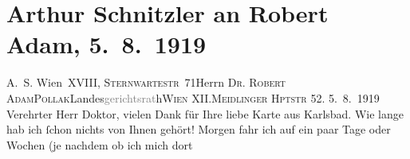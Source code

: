 

         
         \renewcommand{\erwaehntePersonen}{Personen: Robert Adam, Friedrich Rosenthal, Olga Schnitzler, Lili Schnitzler, Heinrich Schnitzler}
         \renewcommand{\erwaehnteOrte}{Orte: Beamtenkurhaus zum Goldenden Kreuz, Karlsbad, Meidlinger Hauptstraße, Reichenau an der Rax, Sternwartestraße, Volkstheater, Wien, XII., Meidling, XVIII., Währing}
         \renewcommand{\erwaehnteWerke}{}
               \section[Arthur Schnitzler an Robert Adam, 5. 8. 1919]{ Arthur Schnitzler an Robert Adam, 5. 8. 1919}\nopagebreak{}\rehead{ }\begin{ledgroupsized}[t]{13cm}\normalsize\beginnumbering{} \toendnotes[C]{\smallbreak\pagebreak[2]} 
\toendnotes[C]{\smallbreak}\pstart{}{\pb}A. S. Wien XVIII, \textsc{Sternwartestr} 71\pend{}{\bigskip}\pstart{}Herrn \textsc{Dr. Robert Adam}\pend{}\pstart{}\textsc{Pollak}\pend{}\pstart{}Landes\textcolor{gray}{gerichtsrat}h\pend{}\pstart{}\textsc{Wien} XII.\pend{}\pstart{}\textsc{Meidlinger Hptstr} 52. \pend{}{\bigskip}\pstart
           \raggedleft{}{\pb}5. 8. 1919\pend
           \pstart
           Verehrter Herr Doktor, vielen Dank für Ihre liebe Karte aus Karlsbad. Wie lange hab ich ſchon nichts von Ihnen
               gehört! Morgen fahr ich auf ein paar Tage oder Wochen (je nachdem ob ich mich dort

\end{ledgroupsized}

